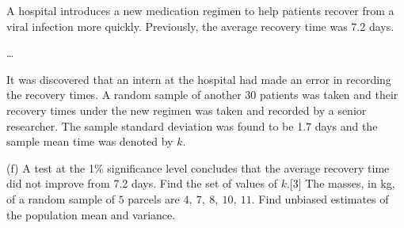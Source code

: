 \noindent A hospital introduces a new medication regimen to help patients recover from a viral infection more quickly. Previously, the average recovery time was 7.2 days.\par
\noindent\ldots\par
\noindent It was discovered that an intern at the hospital had made an error in recording the recovery times. A random sample of another 30 patients was taken and their recovery times under the new regimen was taken and recorded by a senior researcher. The sample standard deviation was found to be 1.7 days and the sample mean time was denoted by $k$.\par
\noindent(f) A test at the 1\% significance level concludes that the average recovery time did not improve from 7.2 days. Find the set of values of $k$.\hfill[3]
\clearpage
\noindent\exlab The masses, in kg, of a random sample of $5$ parcels are $4,\ 7,\ 8,\ 10,\ 11$. Find unbiased estimates of the population mean and variance.
